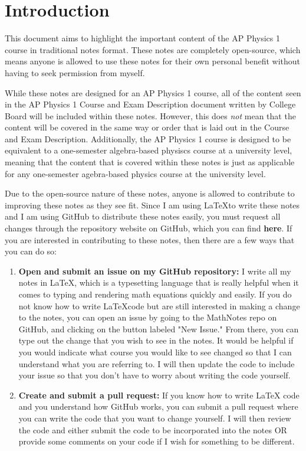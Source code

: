 \documentclass{package/notes}
\begin{document}
\chapter*{Introduction}

This document aims to highlight the important content of the AP Physics 1 course in traditional notes format. These notes are completely open-source, which means anyone is allowed to use these notes for their own personal benefit without having to seek permission from myself. \newline

While these notes are designed for an AP Physics 1 course, all of the content seen in the AP Physics 1 Course and Exam Description document written by College Board will be included within these notes. However, this does \textit{not} mean that the content will be covered in the same way or order that is laid out in the Course and Exam Description. Additionally, the AP Physics 1 course is designed to be equivalent to a one-semester algebra-based physiscs course at a university level, meaning that the content that is covered within these notes is just as applicable for any one-semester agebra-based physics course at the university level. \newline

Due to the open-source nature of these notes, anyone is allowed to contribute to improving these notes as they see fit. Since I am using \LaTeX to write these notes and I am using GitHub to distribute these notes easily, you must request all changes through the repository website on GitHub, which you can find \textbf{here}. If you are interested in contributing to these notes, then there are a few ways that you can do so:\newline

\begin{enumerate}
	\item \textbf{Open and submit an issue on my GitHub repository:} I write all my notes in \LaTeX, which is a typesetting language that is really helpful when it comes to typing and rendering math equations quickly and easily. If you do not know how to write \LaTeX code but are still interested in making a change to the notes, you can open an issue by going to the MathNotes repo on GitHub, and clicking on the button labeled "New Issue." From there, you can type out the change that you wish to see in the notes. It would be helpful if you would indicate what course you would like to see changed so that I can understand what you are referring to. I will then update the code to include your issue so that you don't have to worry about writing the code yourself.
	\item \textbf{Create and submit a pull request:} If you know how to write LaTeX code and you understand how GitHub works, you can submit a pull request where you can write the code that you want to change yourself. I will then review the code and either submit the code to be incorporated into the notes OR provide some comments on your code if I wish for something to be different. 
\end{enumerate}
\end{document}
